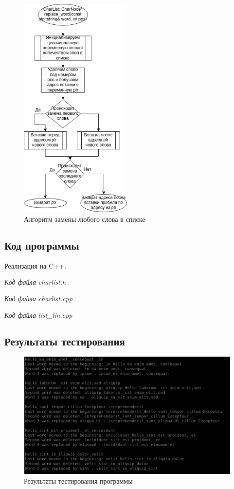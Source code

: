\documentclass[a4paper, 14pt]{extarticle}
\begin{document}
\begin{figure}[htpb]
  \centering
  \includegraphics[width=0.5\textwidth]{pictures/replace_word.png}
  \caption{Алгоритм замены любого слова в списке}
  \label{fig:replace_word}
\end{figure}

\newpage
\subsection{Код программы}
Реализация на C++:

\textit{Код файла charlist.h}


\textit{Код файла charlist.cpp}


\textit{Код файла list\_lin.cpp}

\newpage
\subsection{Результаты тестирования}
\begin{figure}[htpb]
  \centering
  \includegraphics[width=1\textwidth]{pictures/test_list.png}
  \caption{Результаты тестирования программы}
  \label{fig:test}
\end{figure}
\newpage
\end{document}

